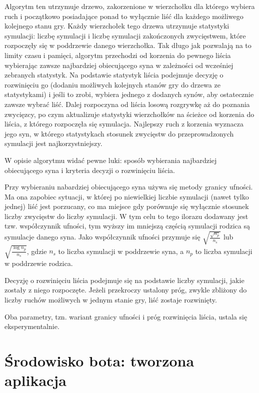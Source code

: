 \documentclass{pracamgr}
\begin{document}
Algorytm ten utrzymuje drzewo, zakorzenione w wierzchołku dla którego wybiera ruch i początkowo posiadające ponad to wyłącznie liść dla każdego możliwego kolejnego stanu gry.
Każdy wierzchołek tego drzewa utrzymuje statystyki symulacji: liczbę symulacji i liczbę symulacji zakończonych zwycięstwem, które rozpoczęły się w poddrzewie danego wierzchołka.
Tak długo jak pozwalają na to limity czasu i pamięci, algorytm przechodzi od korzenia do pewnego liścia wybierając zawsze najbardziej obiecującego syna w zależności od wcześniej zebranych statystyk. Na podstawie statystyk liścia podejmuje decyzję o rozwinięciu go (dodaniu możliwych kolejnych stanów gry do drzewa ze statystykami) i jeśli to zrobi, wybiera jednego z dodanych synów, aby ostatecznie zawsze wybrać liść.
Dalej rozpoczyna od liścia losową rozgrywkę aż do poznania zwycięzcy, po czym aktualizuje statystyki wierzchołków na ścieżce od korzenia do liścia, z którego rozpoczęła się symulacja.
Najlepszy ruch z korzenia wyznacza jego syn, w którego statystykach stosunek zwycięstw do przeprowadzonych symulacji jest najkorzystniejszy.

W opisie algorytmu widać pewne luki: sposób wybierania najbardziej obiecującego syna i kryteria decyzji o rozwinięciu liścia.

Przy wybieraniu nabardziej obiecującego syna używa się metody granicy ufności.
Ma ona zapobiec sytuacji, w której po niewielkiej liczbie symulacji (nawet tylko jednej) liść jest porzucany, co ma miejsce gdy porównuje się wyłącznie stosunek liczby zwycięstw do liczby symulacji.
W tym celu to tego ilorazu dodawany jest tzw. współczynnik ufności, tym wyższy im mniejszą częścią symulacji rodzica są symulacje danego syna. Jako współczynnik ufności przymuje się \(\sqrt{\frac{\sqrt{n_p}}{n_s}}\) lub \(\sqrt{\frac{\log{n_p}}{n_s}}\), gdzie \(n_s\) to liczba symulacji w poddrzewie syna, a \(n_p\) to liczba symulacji w poddrzewie rodzica.

Decyzję o rozwinięciu liścia podejmuje się na podstawie liczby symulacji, jakie zostały z niego rozpoczęte. Jeżeli przekroczy ustalony próg, zwykle zbliżony do liczby ruchów możliwych w jednym stanie gry, liść zostaje rozwinięty.

Oba parametry, tzn. wariant granicy ufności i próg rozwinięcia liścia, ustala się eksperymentalnie.

\chapter{Środowisko bota: tworzona aplikacja}
\end{document}
